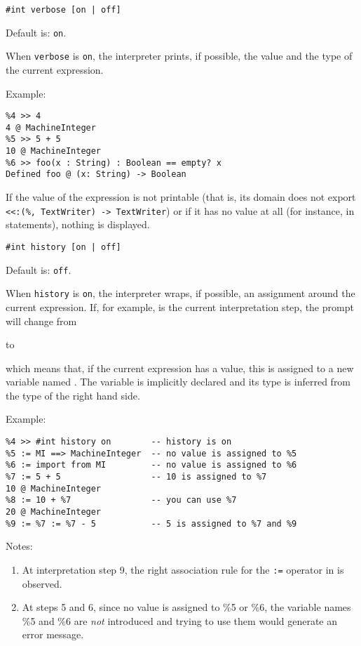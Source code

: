 \mysubsect{} \verb"#int verbose [on | off]"

Default is: \verb"on".
        
When \verb"verbose" is \verb"on", the interpreter prints, if possible,
the value and the type of the current expression. 

Example:
        
{\small
\begin{verbatim}
%4 >> 4
4 @ MachineInteger
%5 >> 5 + 5
10 @ MachineInteger
%6 >> foo(x : String) : Boolean == empty? x
Defined foo @ (x: String) -> Boolean
\end{verbatim}
}
        
If the value of the expression is not printable (that is, its domain
does not export \verb"<<:(%, TextWriter) -> TextWriter") or if it has no
value at all (for instance, in  statements), nothing
is displayed. 

\mysubsect{} \verb"#int history [on | off]"

Default is: \verb"off".


When \verb"history" is \verb"on", the interpreter wraps, if possible, 
an assignment around the current expression.
If, for example,  is the current interpretation step, the
prompt will change from 


to


which means that, if the current expression has a value, this is
assigned to a new variable named . The variable  is
implicitly declared and its type is inferred from the type of
the right hand side.

Example:

{\small
\begin{verbatim}
%4 >> #int history on        -- history is on
%5 := MI ==> MachineInteger  -- no value is assigned to %5
%6 := import from MI         -- no value is assigned to %6
%7 := 5 + 5                  -- 10 is assigned to %7
10 @ MachineInteger
%8 := 10 + %7                -- you can use %7
20 @ MachineInteger
%9 := %7 := %7 - 5           -- 5 is assigned to %7 and %9
\end{verbatim}
}

\goodbreak
Notes:
\begin{enumerate}
\item At interpretation step 9, the right association rule for the
   \verb":=" operator in \asharp{} is observed.
\item At steps 5 and 6, since no value is assigned to \%5 or \%6, the
   variable names \%5 and \%6 are {\em not} introduced and trying to use
   them would generate an error message.
\end{enumerate}


